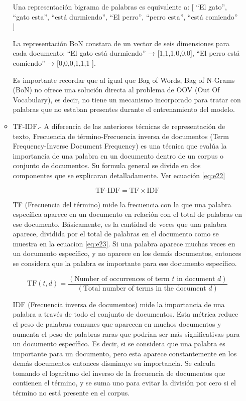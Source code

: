 \begin{itemize}
\begin{itemize}
Una representación bigrama de palabras es equivalente a:
[ ``El gato'', ``gato esta'', ``está durmiendo'', ``El perro'', ``perro esta'', ``está comiendo'' ]

La representación BoN constara de un vector de seis dimensiones para cada documento: ``El gato está durmiendo'' → [1,1,1,0,0,0], ``El perro está comiendo'' → [0,0,0,1,1,1 ].


Es importante recordar que al igual que Bag of Words, Bag of N-Grams (BoN) no ofrece una solución directa al problema de OOV (Out Of Vocabulary), es decir, no tiene un mecanismo incorporado para tratar con palabras que no estaban presentes durante el entrenamiento del modelo.


	\item TF-IDF.- A diferencia de las anteriores técnicas de representación de texto, Frecuencia de término-Frecuencia inversa de documentos (Term Frequency-Inverse Document Frequency) es una técnica que evalúa la importancia de una palabra en un documento dentro de un corpus o conjunto de documentos. Su formula general se divide en dos componentes que se explicaran detalladamente. Ver ecuación \ref{eq:e22}

\begin{equation} \label{eq:e22}
	\textrm{TF-IDF} = \textrm{TF} \times \textrm{IDF}
\end{equation}

TF (Frecuencia del término) mide la frecuencia con la que una palabra específica aparece en un documento en relación con el total de palabras en ese documento. Básicamente, es la cantidad de veces que una palabra aparece, dividida por el total de palabras en el documento como se muestra en la ecuacion \ref{eq:e23}. Si una palabra aparece muchas veces en un documento específico, y no aparece en los demás documentos, entonces se considera que la palabra es importante para ese documento específico.

\begin{equation} \label{eq:e23}
	\textrm{TF}(t,d)=\frac{(\textrm{Number of occurrences of term }t\textrm{ in document }d)}{(\textrm{Total number of terms in the document } d)}
\end{equation}

IDF (Frecuencia inversa de documentos) mide la importancia de una palabra a través de todo el conjunto de documentos. Esta métrica reduce el peso de palabras comunes que aparecen en muchos documentos y aumenta el peso de palabras raras que podrían ser más significativas para un documento específico. Es decir, si se considera que una palabra es importante para un documento, pero esta aparece constantemente en los demás documentos entonces disminuye su importancia. Se calcula tomando el logaritmo del inverso de la frecuencia de documentos que contienen el término, y se suma uno para evitar la división por cero si el término no está presente en el corpus.


\end{itemize}
\end{itemize}
